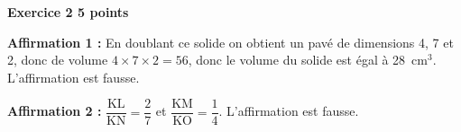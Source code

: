 \textbf{Exercice 2 \hfill 5 points}

\medskip
 
%
%
%
%
%
\textbf{Affirmation 1 :}  En doublant ce solide on obtient un pavé de dimensions 4, 7 et 2, donc de volume $4 \times 7 \times 2 = 56$, donc le volume du solide est égal à 28~cm$^3$. L'affirmation est fausse.

\textbf{Affirmation 2 :} $\dfrac{\text{KL}}{\text{KN}} = \dfrac{2}{7}$ et $\dfrac{\text{KM}}{\text{KO}} = \dfrac{1}{4}$. L'affirmation est fausse.

